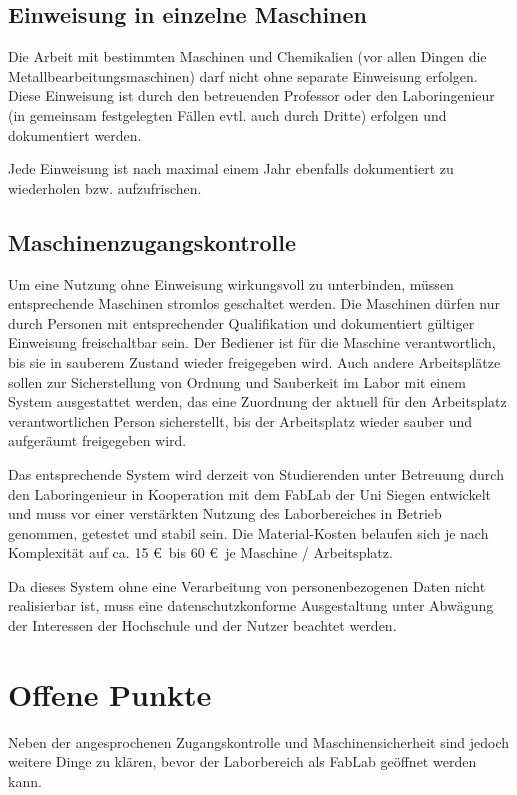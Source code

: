 \documentclass[parskip=half,headsepline,footsepline,titlepage]{scrartcl}
\begin{document}
\subsection{Einweisung in einzelne Maschinen}
Die Arbeit mit bestimmten Maschinen und Chemikalien (vor allen Dingen die Metallbearbeitungsmaschinen) darf nicht ohne separate Einweisung erfolgen. Diese Einweisung ist durch den betreuenden Professor oder den Laboringenieur (in gemeinsam festgelegten Fällen evtl. auch durch Dritte) erfolgen und dokumentiert werden. 

Jede Einweisung ist nach maximal einem Jahr ebenfalls dokumentiert zu wiederholen bzw. aufzufrischen.

\subsection{Maschinenzugangskontrolle}
Um eine Nutzung ohne Einweisung wirkungsvoll zu unterbinden, müssen entsprechende Maschinen stromlos geschaltet werden. Die Maschinen dürfen nur durch Personen mit entsprechender Qualifikation und dokumentiert gültiger Einweisung freischaltbar sein.
Der Bediener ist für die Maschine verantwortlich, bis sie in sauberem Zustand wieder freigegeben wird. Auch andere Arbeitsplätze sollen zur Sicherstellung von Ordnung und Sauberkeit im Labor mit einem System ausgestattet werden, das eine Zuordnung der aktuell für den Arbeitsplatz verantwortlichen Person sicherstellt, bis der Arbeitsplatz wieder sauber und aufgeräumt freigegeben wird.

Das entsprechende System wird derzeit von Studierenden unter Betreuung durch den Laboringenieur in Kooperation mit dem FabLab der Uni Siegen entwickelt und muss vor einer verstärkten Nutzung des Laborbereiches in Betrieb genommen, getestet und stabil sein.
Die Material-Kosten belaufen sich je nach Komplexität auf ca. 15 \euro\ bis 60 \euro\ je Maschine / Arbeitsplatz.

Da dieses System ohne eine Verarbeitung von personenbezogenen Daten nicht realisierbar ist, muss eine datenschutzkonforme Ausgestaltung unter Abwägung der Interessen der Hochschule und der Nutzer beachtet werden.


\section{Offene Punkte}
Neben der angesprochenen Zugangskontrolle und Maschinensicherheit sind jedoch weitere Dinge zu klären, bevor der Laborbereich als FabLab geöffnet werden kann. 
\end{document}
